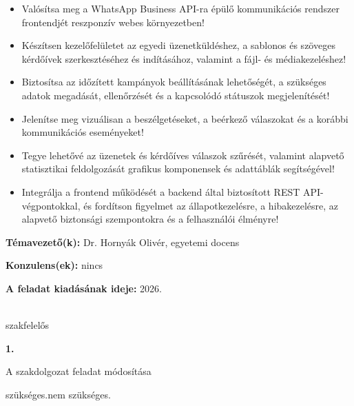 \begin{itemize}
    \setlength\itemsep{0pt}
    \setlength\parskip{0pt}
    \setlength\parsep{0pt}
    \setlength\topsep{1pt}
    \setlength\partopsep{0pt}
    \setlength\leftmargini{1.2em}
    \footnotesize
    \item Valósítsa meg a WhatsApp Business API-ra épülő kommunikációs rendszer frontendjét reszponzív webes környezetben!
    \item Készítsen kezelőfelületet az egyedi üzenetküldéshez, a sablonos és szöveges kérdőívek szerkesztéséhez és indításához, valamint a fájl- és médiakezeléshez!
    \item Biztosítsa az időzített kampányok beállításának lehetőségét, a szükséges adatok megadását, ellenőrzését és a kapcsolódó státuszok megjelenítését!
    \item Jelenítse meg vizuálisan a beszélgetéseket, a beérkező válaszokat és a korábbi kommunikációs eseményeket!
    \item Tegye lehetővé az üzenetek és kérdőíves válaszok szűrését, valamint alapvető statisztikai feldolgozását grafikus komponensek és adattáblák segítségével!
    \item Integrálja a frontend működését a backend által biztosított REST API-végpontokkal, és fordítson figyelmet az állapotkezelésre, a hibakezelésre, az alapvető biztonsági szempontokra és a felhasználói élményre!
\end{itemize}

\vspace{0.35cm}

\noindent\textbf{Témavezető(k):} Dr. Hornyák Olivér, egyetemi docens

\vspace{1mm}
\noindent\textbf{Konzulens(ek):} nincs

\vspace{1mm}
\noindent\textbf{A feladat kiadásának ideje:} 2026. \makebox[3cm]{\dotfill}

\vfill

\begin{flushright}
\makebox[6cm]{\dotfill}\\[-1mm]
szakfelelős
\end{flushright}
\endgroup

\newpage
\begingroup
\footnotesize
\setlength{\parskip}{0pt}
\setlength{\parindent}{0pt}
\noindent
\begin{minipage}[t]{0.08\textwidth}
\textbf{1.}
\end{minipage}
\begin{minipage}[t]{0.88\textwidth}
\begin{center}
A szakdolgozat feladat módosítása
\end{center}
\vspace{1mm}
\hspace*{2cm} szükséges.\hfill nem szükséges.

\vspace{0.55cm}
\makebox[5cm]{\dotfill}\hfill\makebox[7cm]{\dotfill}\\[-1mm]
\hfill{}
\end{minipage}

